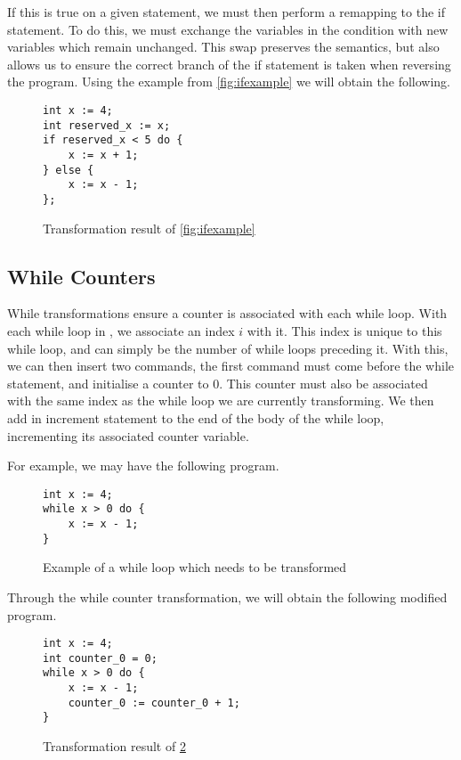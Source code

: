 If this is true on a given statement, we must then perform a remapping to the if statement. To do this, we must exchange the variables in the condition with new variables which remain unchanged. This swap preserves the semantics, but also allows us to ensure the correct branch of the if statement is taken when reversing the program.
Using the example from \ref{fig:ifexample} we will obtain the following.

\begin{figure}[hbt!]
    \centering
    \begin{lstlisting}[label={lst:ifexamplemodified}, basicstyle=\small]
int x := 4;
int reserved_x := x;
if reserved_x < 5 do {
    x := x + 1;
} else {
    x := x - 1;
};
    \end{lstlisting}
    \caption{Transformation result of \ref{fig:ifexample}}
    \label{fig:ifexamplemodified}
\end{figure}

\subsection{While Counters}

While transformations ensure a counter is associated with each while loop. With each while loop in \rimplang, we associate an index $i$ with it. This index is unique to this while loop, and can simply be the number of while loops preceding it. With this, we can then insert two commands, the first command must come before the while statement, and initialise a counter to $0$. This counter must also be associated with the same index as the while loop we are currently transforming. We then add in increment statement to the end of the body of the while loop, incrementing its associated counter variable.

For example, we may have the following program.

\begin{figure}[hbt!]
    \centering
    \begin{lstlisting}[label={lst:whileloop}, basicstyle=\small]
int x := 4;
while x > 0 do {
    x := x - 1;
}
    \end{lstlisting}
    \caption{Example of a while loop which needs to be transformed}
    \label{fig:whileloop}
\end{figure}

Through the while counter transformation, we will obtain the following modified program.

\begin{figure}[hbt!]
    \centering
    \begin{lstlisting}[label={lst:whileloopmodified}, basicstyle=\small]
int x := 4;
int counter_0 = 0;
while x > 0 do {
    x := x - 1;
    counter_0 := counter_0 + 1;
}
    \end{lstlisting}
    \caption{Transformation result of \ref{fig:whileloop}}
    \label{fig:whileloopmodified}
\end{figure}

